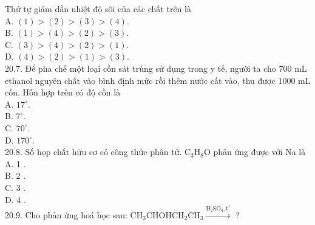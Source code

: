 \documentclass[10pt]{article}
\begin{document}
Thứ tự giảm dần nhiệt độ sôi của các chất trên là\\
A. $(1)>(2)>(3)>(4)$.\\
B. $(1)>(4)>(2)>(3)$.\\
C. $(3)>(4)>(2)>(1)$.\\
D. $(4)>(2)>(1)>(3)$.\\
20.7. Để pha chế một loại cồn sát trùng sử dụng trong y tế, người ta cho 700 mL ethanol nguyên chất vào bình định mức rồi thêm nước cất vào, thu được 1000 mL cồn. Hỗn hợp trên có độ cồn là\\
A. $17^{\circ}$.\\
B. $7^{\circ}$.\\
C. $70^{\circ}$.\\
D. $170^{\circ}$.\\
20.8. Số họp chất hữu cơ có công thức phân tử. $\mathrm{C}_{3} \mathrm{H}_{8} \mathrm{O}$ phản ứng được với Na là\\
A. 1 .\\
B. 2 .\\
C. 3 .\\
D. 4 .\\
20.9. Cho phản ứng hoá học sau: $\mathrm{CH}_{3} \mathrm{CHOHCH}_{2} \mathrm{CH}_{3} \xrightarrow{\mathrm{H}_{2} \mathrm{SO}_{4}, \mathrm{t}^{\circ}}$ ?
\end{document}
